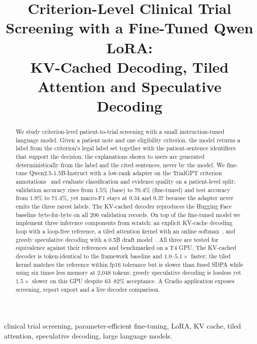 \documentclass[conference]{IEEEtran}
\begin{document}
\title{Criterion-Level Clinical Trial Screening with a Fine-Tuned Qwen LoRA:\\
KV-Cached Decoding, Tiled Attention and Speculative Decoding}

\author{
}

\maketitle

\begin{abstract}
We study criterion-level patient-to-trial screening with a small instruction-tuned language model.
Given a patient note and one eligibility criterion, the model returns a label from the criterion's
legal label set together with the patient-sentence identifiers that support the decision; the
explanations shown to users are generated deterministically from the label and the cited sentences,
never by the model. We fine-tune Qwen2.5-1.5B-Instruct with a low-rank adapter on the TrialGPT
criterion annotations~\cite{jin2024trialgpt} and evaluate classification and evidence quality on a
patient-level split: validation accuracy rises from $1.5\%$ (base) to $70.4\%$ (fine-tuned) and test
accuracy from $1.9\%$ to $71.4\%$, yet macro-F1 stays at $0.34$ and $0.37$ because the adapter never
emits the three rarest labels. The KV-cached decoder reproduces the Hugging Face baseline byte-for-byte on
all 206 validation records. On top of the fine-tuned model we implement three inference components from
scratch: an explicit KV-cache decoding loop with a loop-free reference, a tiled attention kernel
with an online softmax~\cite{milakov2018online,dao2022flashattention}, and greedy speculative
decoding with a 0.5B draft model~\cite{leviathan2023speculative,chen2023speculative}. All three are
tested for equivalence against their references and benchmarked on a T4 GPU. The KV-cached
decoder is token-identical to the framework baseline and $1.0$--$5.1\times$ faster; the tiled kernel
matches the reference within fp16 tolerance but is slower than fused SDPA while using six times less
memory at 2{,}048 tokens; greedy speculative decoding is lossless yet $1.5\times$ slower on this GPU
despite $63$--$82\%$ acceptance. A Gradio application exposes screening, report export and a live
decoder comparison.
\end{abstract}

\begin{IEEEkeywords}
clinical trial screening, parameter-efficient fine-tuning, LoRA, KV cache, tiled attention,
speculative decoding, large language models.
\end{IEEEkeywords}
\end{document}
